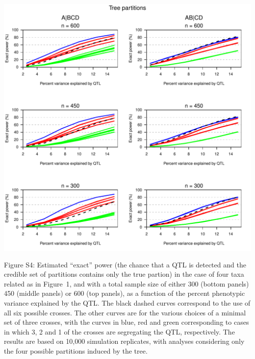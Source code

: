 \documentclass[letterpaper,twoside]{article}
\begin{document}
{\centering
\includegraphics{SuppFigs/expower_treepart.pdf}}

\bigskip \noindent
Figure S4: Estimated ``exact'' power (the chance that a QTL is detected and the
credible set of partitions contains only the true partion) in the case of four taxa related as in
  Figure~1, and with a total sample size of either 300 (bottom panels)
  450 (middle panels) or 600 (top panels), as a function of the
  percent phenotypic variance explained by the QTL.  The black dashed
  curves correspond to the use of all six possible crosses.  The other
  curves are for the various choices of a minimal set of three
  crosses, with the curves in blue, red and green corresponding to
  cases in which 3, 2 and 1 of the crosses are segregating the QTL,
  respectively.  The results are based on 10,000 simulation
  replicates, with analyses considering only the four possible
  partitions induced by the tree.

\newpage
\end{document}
